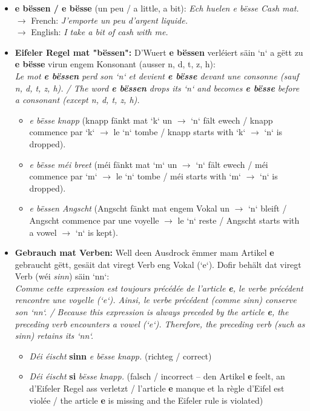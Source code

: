 \begin{itemize}
    \item \textbf{e bëssen / e bësse} (un peu / a little, a bit):
    \textit{Ech huelen e bësse Cash mat.} \\
    $\rightarrow$ French: \textit{J'emporte un peu d'argent liquide.} \\
    $\rightarrow$ English: \textit{I take a bit of cash with me.}
    
    \item \textbf{Eifeler Regel mat "bëssen":}
    D'Wuert \textbf{e bëssen} verléiert säin `n` a gëtt zu \textbf{e bësse} virun engem Konsonant (ausser n, d, t, z, h): \\
    \textit{Le mot \textbf{e bëssen} perd son `n` et devient \textbf{e bësse} devant une consonne (sauf n, d, t, z, h). / The word \textbf{e bëssen} drops its `n` and becomes \textbf{e bësse} before a consonant (except n, d, t, z, h).}
    \begin{itemize}
        \item \textit{e bësse knapp} (knapp fänkt mat `k` un $\rightarrow$ `n` fält ewech / knapp commence par `k` $\rightarrow$ le `n` tombe / knapp starts with `k` $\rightarrow$ `n` is dropped).
        \item \textit{e bësse méi breet} (méi fänkt mat `m` un $\rightarrow$ `n` fält ewech / méi commence par `m` $\rightarrow$ le `n` tombe / méi starts with `m` $\rightarrow$ `n` is dropped).
        \item \textit{e bëssen Angscht} (Angscht fänkt mat engem Vokal un $\rightarrow$ `n` bleift / Angscht commence par une voyelle $\rightarrow$ le `n` reste / Angscht starts with a vowel $\rightarrow$ `n` is kept).
    \end{itemize}
    
    \item \textbf{Gebrauch mat Verben:}
    Well deen Ausdrock ëmmer mam Artikel \textbf{e} gebraucht gëtt, gesäit dat viregt Verb eng Vokal (`e`). Dofir behält dat viregt Verb (wéi \textit{sinn}) säin `nn`: \\
    \textit{Comme cette expression est toujours précédée de l'article \textbf{e}, le verbe précédent rencontre une voyelle (`e`). Ainsi, le verbe précédent (comme \textit{sinn}) conserve son `nn`. / Because this expression is always preceded by the article \textbf{e}, the preceding verb encounters a vowel (`e`). Therefore, the preceding verb (such as \textit{sinn}) retains its `nn`.}
    \begin{itemize}
        \item \textit{Déi éischt} \textbf{sinn} \textit{e bësse knapp.} (richteg / correct)
        \item \textit{Déi éischt} \textbf{si} \textit{bësse knapp.} (falsch / incorrect -- den Artikel \textbf{e} feelt, an d'Eifeler Regel ass verletzt / l'article \textbf{e} manque et la règle d'Eifel est violée / the article \textbf{e} is missing and the Eifeler rule is violated)
    \end{itemize}
\end{itemize}


